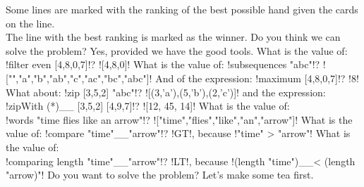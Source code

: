 Some lines are marked with the ranking of the best possible hand given the cards on the line.\\
The line with the best ranking is marked as the winner.
\lhN Do you think we can solve the problem?
\lhA Yes, provided we have the good tools.
\lhN What is the value of:  \il!filter even [4,8,0,7]!?
\lhA \il![4,8,0]!
\lhN What is the value of:  \il!subsequences "abc"!?
\lhA \il!["","a","b","ab","c","ac","bc","abc"]!
\lhN And of the expression: \il!maximum [4,8,0,7]!? 
\lhA \il!8!
\lhN What about: \il!zip [3,5,2] "abc"!?
\lhA \il![(3,'a'),(5,'b'),(2,'c')]!
\lhN and  the expression: \il!zipWith (*)__ [3,5,2] [4,9,7]!?
\lhA \il![12, 45, 14]!
\lhN What is the value of: \\ \il!words "time flies like an arrow"!?
\lhA \il!["time","flies","like","an","arrow"]!
\lhN What is the value of: \il!compare "time"__"arrow"!?
\lhA \il!GT!, because \il!"time" > "arrow"!
\lhN What is the value of:\\ \il!comparing length "time"__"arrow"!?
\lhA \il!LT!, because \il!(length "time")__< (length "arrow)"!
\lhN Do you want to solve the problem? 
\lhA Let's make some tea first.
\lhend








